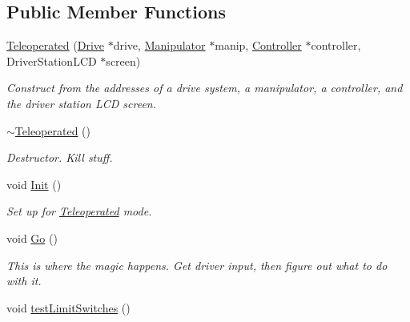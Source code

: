 \subsection*{Public Member Functions}
\begin{DoxyCompactItemize}
\item 
\hyperlink{class_r_j_f_r_c2011_1_1_teleoperated_afe609ebd9360b83b300ad281b1e740c9}{Teleoperated} (\hyperlink{class_r_j_f_r_c2011_1_1_drive}{Drive} $\ast$drive, \hyperlink{class_r_j_f_r_c2011_1_1_manipulator}{Manipulator} $\ast$manip, \hyperlink{class_r_j_f_r_c2011_1_1_controller}{Controller} $\ast$controller, DriverStationLCD $\ast$screen)
\begin{DoxyCompactList}\small\item\em Construct from the addresses of a drive system, a manipulator, a controller, and the driver station LCD screen. \item\end{DoxyCompactList}\item 
\hypertarget{class_r_j_f_r_c2011_1_1_teleoperated_a5e430bcddabb0a4f01784461819034eb}{
\hyperlink{class_r_j_f_r_c2011_1_1_teleoperated_a5e430bcddabb0a4f01784461819034eb}{$\sim$Teleoperated} ()}
\label{class_r_j_f_r_c2011_1_1_teleoperated_a5e430bcddabb0a4f01784461819034eb}

\begin{DoxyCompactList}\small\item\em Destructor. Kill stuff. \item\end{DoxyCompactList}\item 
\hypertarget{class_r_j_f_r_c2011_1_1_teleoperated_a1e3b6d38df0786ccf7f938d60e386aae}{
void \hyperlink{class_r_j_f_r_c2011_1_1_teleoperated_a1e3b6d38df0786ccf7f938d60e386aae}{Init} ()}
\label{class_r_j_f_r_c2011_1_1_teleoperated_a1e3b6d38df0786ccf7f938d60e386aae}

\begin{DoxyCompactList}\small\item\em Set up for \hyperlink{class_r_j_f_r_c2011_1_1_teleoperated}{Teleoperated} mode. \item\end{DoxyCompactList}\item 
void \hyperlink{class_r_j_f_r_c2011_1_1_teleoperated_a5840525ab84532ad9bcfaf7996c3a728}{Go} ()
\begin{DoxyCompactList}\small\item\em This is where the magic happens. Get driver input, then figure out what to do with it. \item\end{DoxyCompactList}\item 
\hypertarget{class_r_j_f_r_c2011_1_1_teleoperated_abd8e4e3da5f5695f409887843a7aecc5}{
void \hyperlink{class_r_j_f_r_c2011_1_1_teleoperated_abd8e4e3da5f5695f409887843a7aecc5}{testLimitSwitches} ()}
\label{class_r_j_f_r_c2011_1_1_teleoperated_abd8e4e3da5f5695f409887843a7aecc5}


\end{DoxyCompactItemize}
